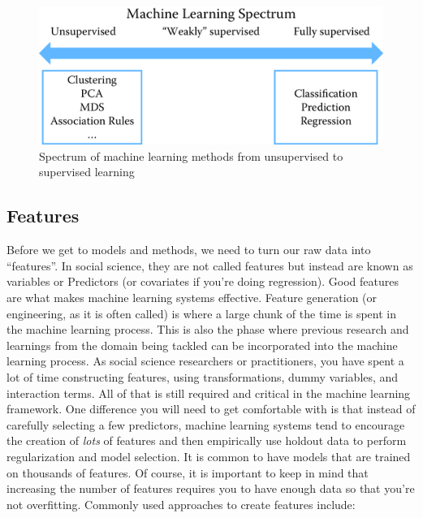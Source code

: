 \documentclass[]{krantz}
\begin{document}
\begin{figure}
{\centering \includegraphics[width=0.7\linewidth]{ChapterML/figures/spectrum} 

}

\caption{Spectrum of machine learning methods from unsupervised to supervised learning}\label{fig:spectrum}
\end{figure}

\subsection{Features}\label{features}

Before we get to models and methods, we need to turn our raw data into
``features''. In social science, they are not called features but
instead are known as variables or Predictors (or covariates if you're
doing regression). {Good features are what makes machine learning
systems effective}. Feature generation (or engineering, as it is often
called) is where a large chunk of the time is spent in the machine
learning process. This is also the phase where previous research and
learnings from the domain being tackled can be incorporated into the
machine learning process. As social science researchers or
practitioners, you have spent a lot of time constructing features, using
transformations, dummy variables, and interaction terms. All of that is
still required and critical in the machine learning framework. One
difference you will need to get comfortable with is that instead of
carefully selecting a few predictors, machine learning systems tend to
encourage the creation of \emph{lots} of features and then empirically
use holdout data to perform regularization and model selection. It is
common to have models that are trained on thousands of features. Of
course, it is important to keep in mind that increasing the number of
features requires you to have enough data so that you're not
overfitting. Commonly used approaches to create features include:
\end{document}
